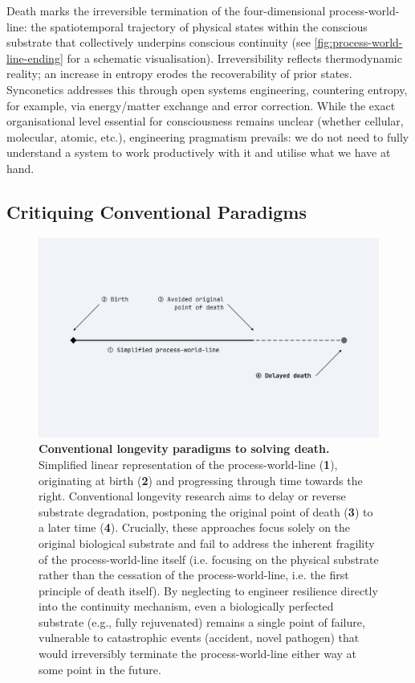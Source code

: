 \documentclass[10pt]{article}
\begin{document}
\begin{sloppypar}
  Death marks the irreversible termination of the four-dimensional process-world-line: the spatiotemporal trajectory of physical states within the conscious substrate that collectively underpins conscious continuity (see \autoref{fig:process-world-line-ending} for a schematic visualisation). Irreversibility reflects thermodynamic reality; an increase in entropy erodes the recoverability of prior states. Synconetics addresses this through open systems engineering, countering entropy, for example, via energy/matter exchange and error correction. While the exact organisational level essential for consciousness remains unclear (whether cellular, molecular, atomic, etc.), engineering pragmatism prevails: we do not need to fully understand a system to work productively with it and utilise what we have at hand.

  \subsection{Critiquing Conventional Paradigms}
  \label{sec:new-paradigm}

  \begin{figure}[ht!]
    \centering
    \includegraphics[width=\textwidth]{figures/longevity-approach.png}
    \caption[Conventional longevity paradigms to solving death]{\textbf{Conventional longevity paradigms to solving death.} Simplified linear representation of the process-world-line (\textbf{1}), originating at birth (\textbf{2}) and progressing through time towards the right. Conventional longevity research aims to delay or reverse substrate degradation, postponing the original point of death (\textbf{3}) to a later time (\textbf{4}). Crucially, these approaches focus solely on the original biological substrate and fail to address the inherent fragility of the process-world-line itself (i.e. focusing on the physical substrate rather than the cessation of the process-world-line, i.e. the first principle of death itself). By neglecting to engineer resilience directly into the continuity mechanism, even a biologically perfected substrate (e.g., fully rejuvenated) remains a single point of failure, vulnerable to catastrophic events (accident, novel pathogen) that would irreversibly terminate the process-world-line either way at some point in the future.}
    \label{fig:longevity-approach}
  \end{figure}


\end{sloppypar}
\end{document}
